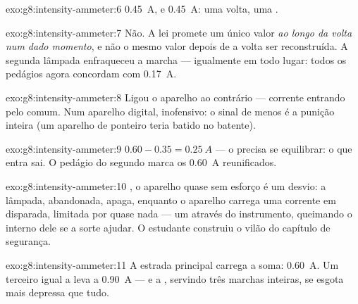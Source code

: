 \begin{solution}{exo:g8:intensity-ammeter:6}
\qty{0.45}{A}, e \qty{0.45}{A}: uma volta, uma .
\end{solution}

\begin{solution}{exo:g8:intensity-ammeter:7}
Não. A lei promete um único valor \emph{ao longo da volta num dado
momento}, e não o mesmo valor depois de a volta ser reconstruída. A
segunda lâmpada enfraqueceu a marcha --- igualmente em todo lugar:
todos os pedágios agora concordam com \qty{0.17}{A}.
\end{solution}

\begin{solution}{exo:g8:intensity-ammeter:8}
Ligou o aparelho ao contrário --- corrente entrando pelo 
comum. Num aparelho digital, inofensivo: o sinal de menos é a punição
inteira (um aparelho de ponteiro teria batido no batente).
\end{solution}

\begin{solution}{exo:g8:intensity-ammeter:9}
$0.60 - 0.35 = \qty{0.25}{A}$ --- o  precisa se equilibrar: o que
entra sai. O pedágio do segundo  marca os \qty{0.60}{A}
reunificados.
\end{solution}

\begin{solution}{exo:g8:intensity-ammeter:10}
, o aparelho quase sem esforço é um desvio: a lâmpada,
abandonada, apaga, enquanto o aparelho carrega uma corrente em
disparada, limitada por quase nada --- um  através do
instrumento, queimando o  interno dele se a sorte ajudar. O
estudante construiu o vilão do capítulo de segurança.
\end{solution}

\begin{solution}{exo:g8:intensity-ammeter:11}
A estrada principal carrega a soma: \qty{0.60}{A}. Um terceiro 
igual a leva a \qty{0.90}{A} --- e a , servindo três marchas
inteiras, se esgota mais depressa que tudo.
\end{solution}

